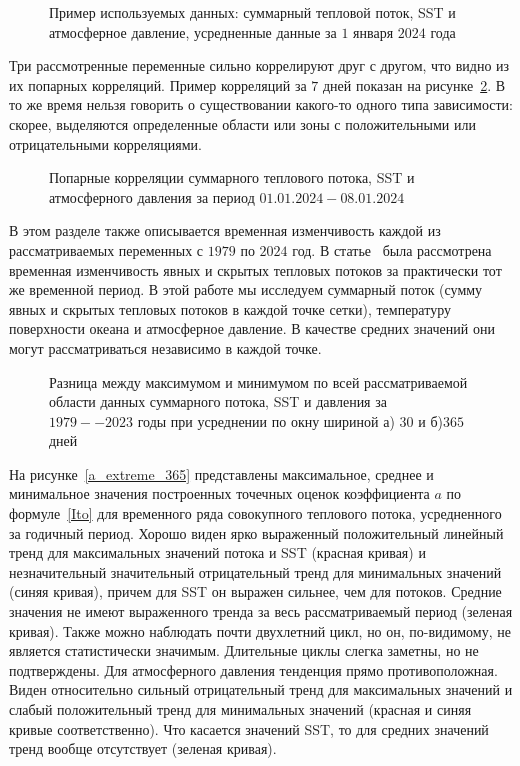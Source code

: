 \begin{figure}
	\caption{Пример используемых данных: суммарный тепловой поток, SST и атмосферное давление, усредненные данные за $1$ января $2024$ года}
	\label{data_example}
\end{figure}

Три рассмотренные переменные сильно коррелируют друг с другом, что видно из их попарных корреляций. Пример корреляций за $7$ дней показан на рисунке~\ref{correlations}. В то же время нельзя говорить о существовании какого-то одного типа зависимости: скорее, выделяются определенные области или зоны с положительными или отрицательными корреляциями.

\begin{figure}
	\caption{Попарные корреляции суммарного теплового потока, SST и атмосферного давления за период $01.01.2024-08.01.2024$}
	\label{correlations}
\end{figure}

В этом разделе также описывается временная изменчивость каждой из рассматриваемых переменных с $1979$ по $2024$ год. В статье~\cite{gorshenin2023stochastic} была рассмотрена временная изменчивость явных и скрытых тепловых потоков за практически тот же временной период. В этой работе мы исследуем суммарный поток (сумму явных и скрытых тепловых потоков в каждой точке сетки), температуру поверхности океана и атмосферное давление. В качестве средних значений они могут рассматриваться независимо в каждой точке.

\begin{figure}
	\caption{Разница между максимумом и минимумом по всей рассматриваемой области данных суммарного потока, SST и давления за $1979--2023$ годы при усреднении по окну шириной а) $30$ и б)$365$ дней}
	\label{raw_trends}
\end{figure}

На рисунке~\ref{a_extreme_365} представлены максимальное, среднее и минимальное значения построенных точечных оценок коэффициента $a$ по формуле~\eqref{Ito} для временного ряда совокупного теплового потока, усредненного за годичный период. Хорошо виден ярко выраженный положительный линейный тренд для максимальных значений потока и SST (красная кривая) и незначительный значительный отрицательный тренд для минимальных значений (синяя кривая), причем для SST он выражен сильнее, чем для потоков. Средние значения не имеют выраженного тренда за весь рассматриваемый период (зеленая кривая). Также можно наблюдать почти двухлетний цикл, но он, по-видимому, не является статистически значимым. Длительные циклы слегка заметны, но не подтверждены. Для атмосферного давления тенденция прямо противоположная. Виден относительно сильный отрицательный тренд для максимальных значений и слабый положительный тренд для минимальных значений (красная и синяя кривые соответственно). Что касается значений SST, то для средних значений тренд вообще отсутствует (зеленая кривая).


